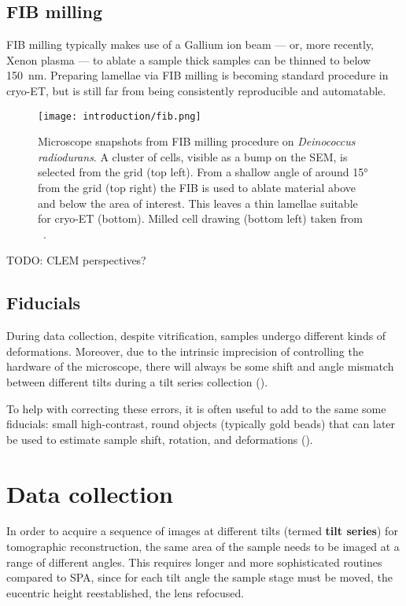 \subsection{FIB milling}
FIB milling typically makes use of a Gallium ion beam --- or, more recently, Xenon plasma --- to ablate a sample
thick samples can be thinned to below \qty{150}{\nano\meter}.
Preparing lamellae via FIB milling is becoming standard procedure in cryo-ET, but is still far from being consistently reproducible and automatable.

\begin{figure}[ht]
    \centering
    \texttt{[image: introduction/fib.png]}
    \caption[FIB milling]{Microscope snapshots from FIB milling procedure on \textit{Deinococcus radiodurans}. A cluster of cells, visible as a bump on the SEM, is selected from the grid (top left). From a shallow angle of around \ang{15} from the grid (top right) the FIB is used to ablate material above and below the area of interest. This leaves a thin lamellae suitable for cryo-ET (bottom). Milled cell drawing (bottom left) taken from ~\citet{villaOpeningWindowsCell2013}.}
    \label{fig:et_fib_milling}
\end{figure}

TODO: CLEM perspectives?

\subsection{Fiducials}\label{fiducials}
During data collection, despite vitrification, samples undergo different kinds of deformations.
Moreover, due to the intrinsic imprecision of controlling the hardware of the microscope, there will always be some shift and angle mismatch between different tilts during a tilt series collection ().

To help with correcting these errors, it is often useful to add to the same some fiducials: small high-contrast, round objects (typically gold beads) that can later be used to estimate sample shift, rotation, and deformations ().

\section{Data collection}\label{et_data_collection}
In order to acquire a sequence of images at different tilts (termed \textbf{tilt series}) for tomographic reconstruction, the same area of the sample needs to be imaged at a range of different angles.
This requires longer and more sophisticated routines compared to SPA, since for each tilt angle the sample stage must be moved, the eucentric height reestablished, the lens refocused.

